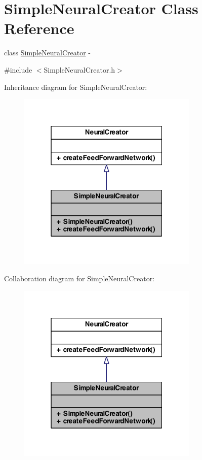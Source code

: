 \hypertarget{class_simple_neural_creator}{
\section{SimpleNeuralCreator Class Reference}
\label{class_simple_neural_creator}
}


class \hyperlink{class_simple_neural_creator}{SimpleNeuralCreator} -\/  




{\ttfamily \#include $<$SimpleNeuralCreator.h$>$}



Inheritance diagram for SimpleNeuralCreator:\nopagebreak
\begin{figure}[H]
\begin{center}
\leavevmode
\includegraphics[width=244pt]{class_simple_neural_creator__inherit__graph}
\end{center}
\end{figure}


Collaboration diagram for SimpleNeuralCreator:\nopagebreak
\begin{figure}[H]
\begin{center}
\leavevmode
\includegraphics[width=244pt]{class_simple_neural_creator__coll__graph}
\end{center}
\end{figure}
